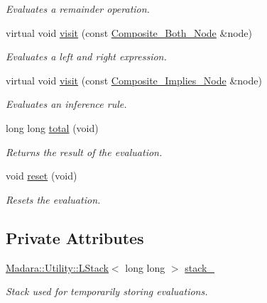 \begin{DoxyCompactItemize}
\begin{DoxyCompactList}\small\item\em Evaluates a remainder operation. \item\end{DoxyCompactList}\item 
virtual void \hyperlink{classMadara_1_1Expression__Tree_1_1Evaluation__Visitor_a35e6b96e1ff68fa0ee1f3d0df07f9d0d}{visit} (const \hyperlink{classMadara_1_1Expression__Tree_1_1Composite__Both__Node}{Composite\_\-Both\_\-Node} \&node)
\begin{DoxyCompactList}\small\item\em Evaluates a left and right expression. \item\end{DoxyCompactList}\item 
virtual void \hyperlink{classMadara_1_1Expression__Tree_1_1Evaluation__Visitor_abbcab30bdf0f2e1c760de6bc382c1723}{visit} (const \hyperlink{classMadara_1_1Expression__Tree_1_1Composite__Implies__Node}{Composite\_\-Implies\_\-Node} \&node)
\begin{DoxyCompactList}\small\item\em Evaluates an inference rule. \item\end{DoxyCompactList}\item 
long long \hyperlink{classMadara_1_1Expression__Tree_1_1Evaluation__Visitor_abca833110f678ead9a8b57817b701078}{total} (void)
\begin{DoxyCompactList}\small\item\em Returns the result of the evaluation. \item\end{DoxyCompactList}\item 
void \hyperlink{classMadara_1_1Expression__Tree_1_1Evaluation__Visitor_a9ba7891b19645979106dca75afcf1d6c}{reset} (void)
\begin{DoxyCompactList}\small\item\em Resets the evaluation. \item\end{DoxyCompactList}\end{DoxyCompactItemize}
\subsection*{Private Attributes}
\begin{DoxyCompactItemize}
\item 
\hyperlink{classMadara_1_1Utility_1_1LStack}{Madara::Utility::LStack}$<$ long long $>$ \hyperlink{classMadara_1_1Expression__Tree_1_1Evaluation__Visitor_a1d83cf18c9cc232176789d95e322b9f1}{stack\_\-}
\begin{DoxyCompactList}\small\item\em Stack used for temporarily storing evaluations. \item\end{DoxyCompactList}\end{DoxyCompactItemize}


